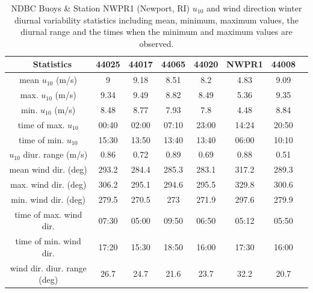 \begin{table}[H]
\begin{tabular*}{\textwidth}{c @{\extracolsep{\fill}} ccccccc}
\toprule
    ~       Statistics  & 44025 & 44017 & 44065 & 44020 & NWPR1 & 44008 \\ \midrule
    mean $u_{10}$ (m/s)        & 9     & 9.18  & 8.51  & 8.2   & 4.83  & 9.09  \\
    max. $u_{10}$ (m/s)        & 9.34  & 9.49  & 8.82  & 8.49  & 5.36  & 9.35  \\
    min. $u_{10}$ (m/s)         & 8.48  & 8.77  & 7.93  & 7.8   & 4.48  & 8.84  \\
    time of max. $u_{10}$      & 00:40 & 02:00 & 07:10 & 23:00 & 14:24 & 20:50 \\
    time of min. $u_{10}$      & 15:30 & 13:50 & 13:40 & 13:40 & 06:00 & 10:10 \\
    $u_{10}$ diur. range (m/s) & 0.86  & 0.72  & 0.89  & 0.69  & 0.88  & 0.51  \\ \midrule
    mean wind dir. (deg)            & 293.2 & 284.4 & 285.3 & 283.1 & 317.2 & 289.3 \\
    max. wind dir. (deg)            & 306.2 & 295.1 & 294.6 & 295.5 & 329.8 & 300.6 \\
    min. wind dir. (deg)            & 279.5 & 270.5 & 273   & 271.9 & 297.6 & 279.9 \\
    time of max. wind dir.           & 07:30 & 05:00 & 09:50 & 06:50 & 05:12 & 05:50 \\
    time of min. wind dir.           & 17:20 & 15:30 & 18:50 & 16:00 & 17:30 & 16:00 \\
    wind dir. diur. range (deg)     & 26.7  & 24.7  & 21.6  & 23.7  & 32.2  & 20.7  \\ \bottomrule
\end{tabular*}
\caption {NDBC Buoys \& Station NWPR1 (Newport, RI) $u_{10}$ and wind direction winter diurnal variability statistics including mean, minimum, maximum values, the diurnal range and the times when the minimum and maximum values are observed.}
\label{tab:diurnal_winter}
\end{table}


